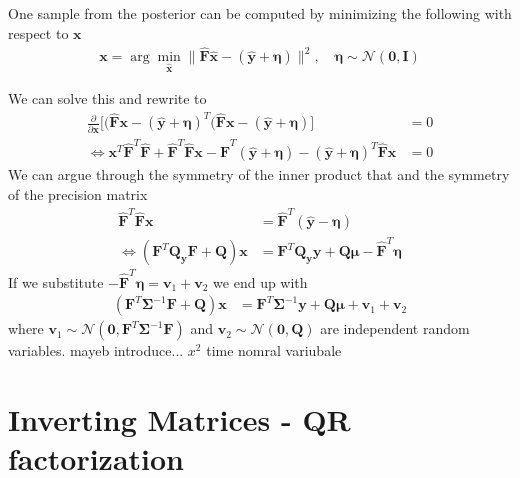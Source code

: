 One sample from the posterior can be computed by minimizing the following with respect to $\bm{x}$
\begin{align}
    \bm{x} = \arg \min_{\hat{\bm{x}}} \lVert \hat{\bm{F}} \hat{\bm{x}} - ( \hat{\bm{y}} + \bm{\eta} ) \rVert^2 , \quad \bm{\eta} \sim \mathcal{N}(\bm{0}, \mathbf{I})
\end{align}

We can solve this and rewrite to
\begin{align}
    \frac{\partial}{\partial \bm{x} }  \big[   (\hat{\bm{F}} \bm{x} - ( \hat{\bm{y}} + \bm{\eta} )^T (\hat{\bm{F}} \bm{x} - ( \hat{\bm{y}} + \bm{\eta} ) \big] &= 0 \\
    \Leftrightarrow \bm{x}^T \hat{\bm{F}}^T  \hat{\bm{F}} + \hat{\bm{F}}^T \hat{\bm{F}} \bm{x} -  \hat{\bm{F}}^T ( \hat{\bm{y}} + \bm{\eta} )- ( \hat{\bm{y}} + \bm{\eta} )^T  \hat{\bm{F}} \bm{x}  &= 0
\end{align}
We can argue through the symmetry of the inner product that and the symmetry of the precision matrix
\begin{align}
    \hat{\bm{F}}^T \hat{\bm{F}} \bm{x} &= \hat{\bm{F}}^T ( \hat{\bm{y}} - \bm{\eta}) \\
    \Leftrightarrow  (\bm{F}^T \bm{Q_y} \bm{F}+
    \bm{Q} ) \bm{x} &= \bm{F}^T \bm{Q_y} \bm{y} +  \bm{Q} \bm{\mu} - \hat{\bm{F}}^T  \bm{\eta}  
\end{align}
If we substitute $ - \hat{\bm{F}}^T  \bm{\eta}  = \bm{v}_1 + \bm{v}_2$ we end up with 
\begin{align}
    (\bm{F}^T \bm{\Sigma}^{-1} \bm{F}+
    \bm{Q} ) \bm{x} &= \bm{F}^T \bm{\Sigma}^{-1} \bm{y} +  \bm{Q} \bm{\mu} + \bm{v}_1 + \bm{v}_2
\end{align}
where $\bm{v}_1 \sim \mathcal{N}(\bm{0}, \bm{F}^T \bm{\Sigma}^{-1} \bm{F}) $ and $\bm{v}_2 \sim \mathcal{N}(\bm{0}, \bm{Q} )$ are independent random variables.
mayeb introduce... $x^2$ time nomral variubale


\chapter{Inverting Matrices - QR factorization}


